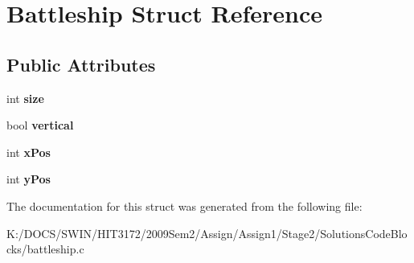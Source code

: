 \hypertarget{struct_battleship}{
\section{Battleship Struct Reference}
\label{struct_battleship}
}
\subsection*{Public Attributes}
\begin{DoxyCompactItemize}
\item 
\hypertarget{struct_battleship_ae70257522cdd8b6240be0239a127e921}{
int {\bfseries size}}
\label{struct_battleship_ae70257522cdd8b6240be0239a127e921}

\item 
\hypertarget{struct_battleship_aed7a55c83eaa62e362fa4b0fcf7c98b6}{
bool {\bfseries vertical}}
\label{struct_battleship_aed7a55c83eaa62e362fa4b0fcf7c98b6}

\item 
\hypertarget{struct_battleship_a7691007906ba8d0de57d6157b3bf3a98}{
int {\bfseries xPos}}
\label{struct_battleship_a7691007906ba8d0de57d6157b3bf3a98}

\item 
\hypertarget{struct_battleship_aa9c018776a64b9185a98d27a132af99a}{
int {\bfseries yPos}}
\label{struct_battleship_aa9c018776a64b9185a98d27a132af99a}

\end{DoxyCompactItemize}


The documentation for this struct was generated from the following file:\begin{DoxyCompactItemize}
\item 
K:/DOCS/SWIN/HIT3172/2009Sem2/Assign/Assign1/Stage2/SolutionsCodeBlocks/battleship.c\end{DoxyCompactItemize}
